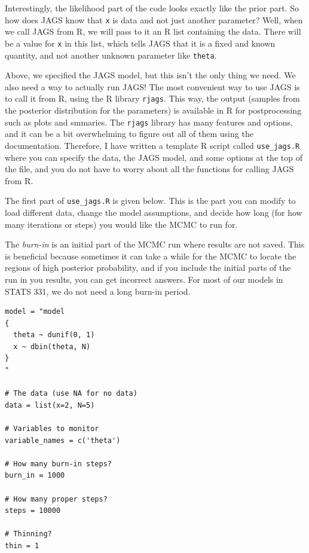 Interestingly, the likelihood part of the code looks exactly like the
prior part. So how does JAGS know that {\tt x} is data and not just another
parameter? Well, when we call JAGS from R, we will pass to it an R list containing
the data. There will be a value for {\tt x} in this list, which tells JAGS that
it is a fixed and known quantity, and not another unknown parameter like {\tt theta}.

Above, we specified the JAGS model, but this isn't the only thing we need.
We also need a way to actually run JAGS! The most
convenient way to use JAGS is to call it from R, using the R library
{\tt rjags}. This way, the output (samples from the posterior distribution for
the parameters) is available in R for postprocessing such as plots and
smmaries. The
{\tt rjags} library has many features and options, and it can be a bit
overwhelming to figure out all of them using the documentation.
Therefore, I have written a template
R script called {\tt use\_jags.R} where you can specify the data, the JAGS
model, and some options at the
top of the file, and you do not have to worry about all the functions for
calling JAGS from R.

The first part of {\tt use\_jags.R} is given below. This is the part you
can modify to load different data, change the model assumptions, and decide
how long (for how many iterations or steps) you would like the MCMC to run for.

The {\it burn-in} is an initial part of the
MCMC run where results are not saved. This is beneficial because sometimes
it can take a while for the MCMC to locate the regions of high posterior
probability, and if you include the initial parts of the run in you results,
you can get incorrect answers. For most of our models in STATS 331, we do not
need a long burn-in period.

\begin{verbatim}
model = "model
{
  theta ~ dunif(0, 1)
  x ~ dbin(theta, N)
}
"

# The data (use NA for no data)
data = list(x=2, N=5)

# Variables to monitor
variable_names = c('theta')

# How many burn-in steps?
burn_in = 1000

# How many proper steps?
steps = 10000

# Thinning?
thin = 1
\end{verbatim}

